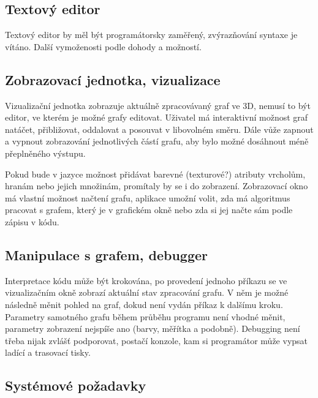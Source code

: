 \documentclass[11pt,twoside,a4paper]{book}
\begin{document}
\subsection{Textový editor}

Textový editor by měl být programátorsky zaměřený, zvýrazňování syntaxe je vítáno. Další vymoženosti podle dohody a možností.


\subsection{Zobrazovací jednotka, vizualizace}

Vizualizační jednotka zobrazuje aktuálně zpracovávaný graf ve 3D, nemusí to být editor, ve kterém je možné grafy editovat. Uživatel má interaktivní možnost graf natáčet, přibližovat, oddalovat a posouvat v libovolném směru. Dále vůže zapnout a vypnout zobrazování jednotlivých částí grafu, aby bylo možné dosáhnout méně přeplněného výstupu.

Pokud bude v jazyce možnost přidávat barevné (texturové?) atributy vrcholům, hranám nebo jejich množinám, promítaly by se i do zobrazení. Zobrazovací okno má vlastní možnost načtení grafu, aplikace umožní volit, zda má algoritmus pracovat s grafem, který je v grafickém okně nebo zda si jej načte sám podle zápisu v kódu.


\subsection{Manipulace s grafem, debugger}

Interpretace kódu může být krokována, po provedení jednoho příkazu se ve vizualizačním okně zobrazí aktuální stav zpracování grafu. V něm je možné následně měnit pohled na graf, dokud není vydán příkaz k dalšímu kroku. Parametry samotného grafu během průběhu programu není vhodné měnit, parametry zobrazení nejspíše ano (barvy, měřítka a podobně). Debugging není třeba nijak zvlášť podporovat, postačí konzole, kam si programátor může vypsat ladící a trasovací tisky.


\subsection{Systémové požadavky}
\end{document}
